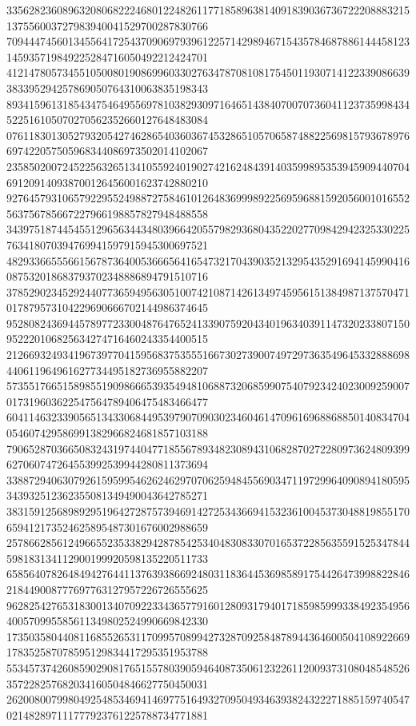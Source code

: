 \begin{DoxyCode}
      335628236089632080682224680122482611771858963814091839036736722208883215137556003727983940041529700287830766
      709444745601345564172543709069793961225714298946715435784687886144458123145935719849225284716050492212424701
      412147805734551050080190869960330276347870810817545011930714122339086639383395294257869050764310063835198343
      893415961318543475464955697810382930971646514384070070736041123735998434522516105070270562352660127648483084
      076118301305279320542746286540360367453286510570658748822569815793678976697422057505968344086973502014102067
      235850200724522563265134105592401902742162484391403599895353945909440704691209140938700126456001623742880210
      927645793106579229552498872758461012648369998922569596881592056001016552563756785667227966198857827948488558
      343975187445455129656344348039664205579829368043522027709842942325330225763418070394769941597915945300697521
      482933665556615678736400536665641654732170439035213295435291694145990416087532018683793702348886894791510716
      378529023452924407736594956305100742108714261349745956151384987137570471017879573104229690666702144986374645
      952808243694457897723300487647652413390759204340196340391147320233807150952220106825634274716460243354400515
      212669324934196739770415956837535551667302739007497297363549645332888698440611964961627734495182736955882207
      573551766515898551909866653935494810688732068599075407923424023009259007017319603622547564789406475483466477
      604114632339056513433068449539790709030234604614709616968868850140834704054607429586991382966824681857103188
      790652870366508324319744047718556789348230894310682870272280973624809399627060747264553992539944280811373694
      338872940630792615959954626246297070625948455690347119729964090894180595343932512362355081349490043642785271
      383159125689892951964272875739469142725343669415323610045373048819855170659412173524625895487301676002988659
      257866285612496655235338294287854253404830833070165372285635591525347844598183134112900199920598135220511733
      658564078264849427644113763938669248031183644536985891754426473998822846218449008777697763127957226726555625
      962825427653183001340709223343657791601280931794017185985999338492354956400570995585611349802524990669842330
      173503580440811685526531170995708994273287092584878944364600504108922669178352587078595129834417295351953788
      553457374260859029081765155780390594640873506123226112009373108048548526357228257682034160504846627750450031
      262008007998049254853469414697751649327095049346393824322271885159740547021482897111777923761225788734771881

\end{DoxyCode}

